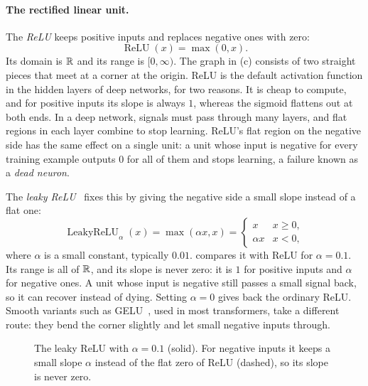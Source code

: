 \paragraph{The rectified linear unit.}
The \emph{ReLU} keeps positive inputs and replaces negative ones with zero:
\[
  \operatorname{ReLU}(x) = \max(0, x).
\]
Its domain is $\mathbb{R}$ and its range is $[0, \infty)$. The graph in
(c) consists of two straight pieces that meet at
a corner at the origin. ReLU is the default activation function in the
hidden layers of deep networks, for two reasons. It is cheap to compute,
and for positive inputs its slope is always $1$, whereas the sigmoid
flattens out at both ends. In a deep network, signals must pass through
many layers, and flat regions in each layer combine to stop learning.
ReLU's flat region on the negative side has the same effect on a single
unit: a unit whose input is negative for every training example outputs
$0$ for all of them and stops learning, a failure known as a \emph{dead
neuron}.

The \emph{leaky ReLU}~\cite{maas2013rectifier} fixes this by giving the
negative side a small slope instead of a flat one:
\[
  \operatorname{LeakyReLU}_\alpha(x) = \max(\alpha x, x)
  = \begin{cases}
    x & x \ge 0, \\
    \alpha x & x < 0,
  \end{cases}
\]
where $\alpha$ is a small constant, typically $0.01$.
 compares it with ReLU for $\alpha = 0.1$. Its range is
all of $\mathbb{R}$, and its slope is never zero: it is $1$ for positive inputs and
$\alpha$ for negative ones. A unit whose input is negative still passes a
small signal back, so it can recover instead of dying. Setting $\alpha = 0$
gives back the ordinary ReLU. Smooth variants such as
GELU~\cite{hendrycks2016gelu}, used in most transformers, take a different
route: they bend the corner slightly and let small negative inputs through.

\begin{figure}[ht]
  \centering
  \caption{The leaky ReLU with $\alpha = 0.1$ (solid). For negative inputs
    it keeps a small slope $\alpha$ instead of the flat zero of ReLU
    (dashed), so its slope is never zero.}
  \label{fig:ch01-leaky-relu}
\end{figure}

